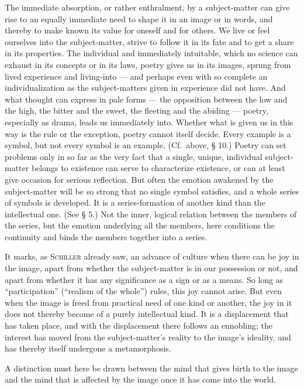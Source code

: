 \documentclass[12pt]{book}
\newcommand{\opage}[1]{\marginnote{\footnotesize\textit{[#1]}}}
\begin{document}
The immediate absorption, or rather enthralment, by a subject-matter can give rise
to an equally immediate need to shape it in an image or in words, and thereby to
make known its value for oneself and for others. We live or feel ourselves into
the subject-matter, strive to follow it in its fate and to get a share in its
properties. The individual and immediately intuitable, which no science can
exhaust in its concepts or in its laws, poetry gives us in its images, sprung from
lived experience and living-into --- and perhaps even with so complete an
individualization as the subject-matters given in experience did not have. And
what thought can express in pale forms --- the opposition between the low and the
high, \opage{130}the bitter and the sweet, the fleeting and the abiding --- poetry, especially
as drama, leads us immediately into. Whether what is given us in this way is the
rule or the exception, poetry cannot itself decide. Every example is a symbol, but
not every symbol is an example. (Cf.\ above, § 10.) Poetry can set problems only
in so far as the very fact that a single, unique, individual subject-matter belongs
to existence can serve to characterize existence, or can at least give occasion for
serious reflection. But often the emotion awakened by the subject-matter will be so
strong that no single symbol satisfies, and a whole series of symbols is developed.
It is a series-formation of another kind than the intellectual one. (See § 5.) Not
the inner, logical relation between the members of the series, but the emotion
underlying all the members, here conditions the continuity and binds the members
together into a series.

It marks, as \textsc{Schiller} already saw, an advance of culture when there can
be joy in the image, apart from whether the subject-matter is in our possession or
not, and apart from whether it has any significance as a sign or as a means. So
long as ``participation'' (``realism of the whole'') rules, this joy cannot arise.
But even when the image is freed from practical need of one kind or another, the
joy in it does not thereby become of a purely intellectual kind. It is a
displacement that has taken place, and with the displacement there follows an
ennobling; the interest has moved from the subject-matter's reality to the image's
ideality, and has thereby itself undergone a metamorphosis.

A distinction must here be drawn between the mind that gives birth to the image
and the mind that is affected by the image once it has come into the world.
\end{document}
